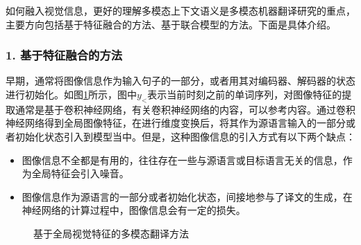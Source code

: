 \parinterval 如何融入视觉信息，更好的理解多模态上下文语义是多模态机器翻译研究的重点，主要方向包括基于特征融合的方法、基于联合模型的方法。下面是具体介绍。


\subsubsection{1. 基于特征融合的方法}

\parinterval 早期，通常将图像信息作为输入句子的一部分，或者用其对编码器、解码器的状态进行初始化。如图\ref{fig:17-12}所示，图中$y_{<}$表示当前时刻之前的单词序列，对图像特征的提取通常是基于卷积神经网络，有关卷积神经网络的内容，可以参考{\chaptereleven}内容。通过卷积神经网络得到全局图像特征，在进行维度变换后，将其作为源语言输入的一部分或者初始化状态引入到模型当中。但是，这种图像信息的引入方式有以下两个缺点：

\begin{itemize}
    \vspace{0.5em}
    \item 图像信息不全都是有用的，往往存在一些与源语言或目标语言无关的信息，作为全局特征会引入噪音。
    \vspace{0.5em}
    \item 图像信息作为源语言的一部分或者初始化状态，间接地参与了译文的生成，在神经网络的计算过程中，图像信息会有一定的损失。
    \vspace{0.5em}
\end{itemize}

\begin{figure}[htp]
\centering

\caption{基于全局视觉特征的多模态翻译方法}
\label{fig:17-12}
\end{figure}

